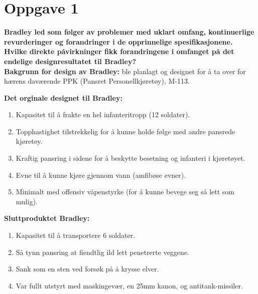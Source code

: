 \section*{Oppgave 1}

	{\bf Bradley led som følger av problemer med uklart omfang, kontinuerlige revurderinger
	og forandringer i de opprinnelige spesifikasjonene. Hvilke direkte påvirkninger fikk
	forandringene i omfanget på det endelige designresultatet til Bradley?} \\

	{\bf Bakgrunn for design av Bradley:} ble planlagt og designet for å ta over for hærens
	daværende PPK (Pansret Personellkjøretøy), M-113.

	{\bf Det orginale designet til Bradley:}
	\begin{enumerate}
		\item Kapasitet til å frakte en hel infanteritropp (12 soldater).
		\item Topphastighet tilstrekkelig for å kunne holde følge med andre pansrede kjøretøy.
		\item Kraftig pansring i sidene for å beskytte besetning og infanteri i kjøretøyet.
		\item Evne til å kunne kjøre gjennom vann (amfibøse evner).
		\item Minimalt med offensiv våpenstyrke (for å kunne bevege seg så lett som mulig).
	\end{enumerate}

	{\bf Sluttproduktet Bradley:}
	\begin{enumerate}
		\item Kapasitet til å transportere 6 soldater.
		\item Så tynn pansring at fiendtlig ild lett penetrerte veggene.
		\item Sank som en sten ved forsøk på å krysse elver.
		\item Var fullt utstyrt med maskingevær, en 25mm kanon, og antitank-missiler.
	\end{enumerate}


